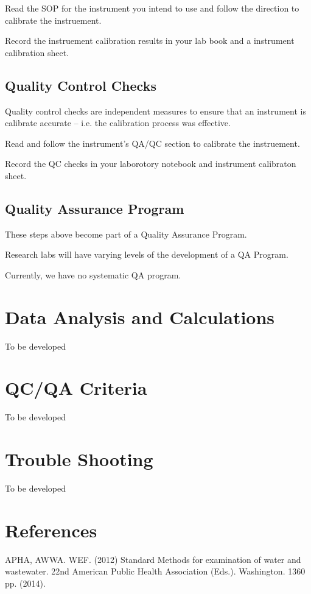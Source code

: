\documentclass[12pt]{../SOP3_beta}
\begin{document}
\NP Read the SOP for the instrument you intend to use and follow the direction to calibrate the instruement.

\NP Record the instruement calibration results in your lab book and a instrument calibration sheet.

\subsection{Quality Control Checks}

\NP Quality control checks are independent measures to ensure that an instrument is calibrate accurate -- i.e. the calibration process was effective.

\NP Read and follow the instrument's QA/QC section to calibrate the instruement.

\NP Record the QC checks in your laborotory notebook and instrument calibraton sheet.

\subsection{Quality Assurance Program}

\NP These steps above become part of a Quality Assurance Program. 

\NP Research labs will have varying levels of the development of a QA Program.

\NP Currently, we have no systematic QA program.

\section{Data Analysis and Calculations}

\NP To be developed 

\section{QC/QA Criteria}

\NP To be developed

\section{Trouble Shooting}

\NP To be developed

\section{References}

\NP APHA, AWWA. WEF. (2012) Standard Methods for examination of water and wastewater. 22nd American Public Health Association (Eds.). Washington. 1360 pp. (2014).
\end{document}
